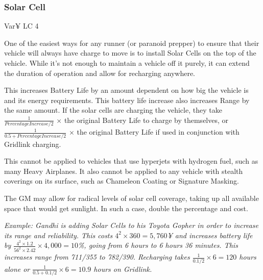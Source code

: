 \begin{multicols*}{2}
	\subsubsection{Solar Cell}
	Var¥ LC 4
	
	One of the easiest ways for any runner (or paranoid prepper) to ensure that their vehicle will always have charge to move is to install Solar Cells on the top of the vehicle. While it's not enough to maintain a vehicle off it purely, it can extend the duration of operation and allow for recharging anywhere.
	
	This increases Battery Life by an amount dependent on how big the vehicle is and its energy requirements. This battery life increase also increases Range by the same amount. If the solar cells are charging the vehicle, they take $\frac{1}{Percentage Increase/2}$ $\times$ the original Battery Life to charge by themselves, or $\frac{1}{0.5 + Percentage Increase/2}$ $\times$ the original Battery Life if used in conjunction with Gridlink charging.
	
	This cannot be applied to vehicles that use hyperjets with hydrogen fuel, such as many Heavy Airplanes. It also cannot be applied to any vehicle with stealth coverings on its surface, such as Chameleon Coating or Signature Masking.
	

	The GM may allow for radical levels of solar cell coverage, taking up all available space that would get sunlight. In such a case, double the percentage and cost.

	\textcolor{OliveGreen}{\textit{Example: Gandhi is adding Solar Cells to his Toyota Gopher in order to increase its range and reliability. This costs $4^2 \times 360 = 5,760$¥ and increases battery life by $\frac{4^2 \times 1.2}{56^2 \times 2.42} \times 4,000 = 10$\%, going from 6 hours to 6 hours 36 minutes. This increases range from 711/355 to 782/390. Recharging takes $\frac{1}{0.1/2} \times 6 = 120$ hours alone or $\frac{1}{0.5 + 0.1/2} \times 6 = 10.9$ hours on Gridlink.}}
	

\end{multicols*}

